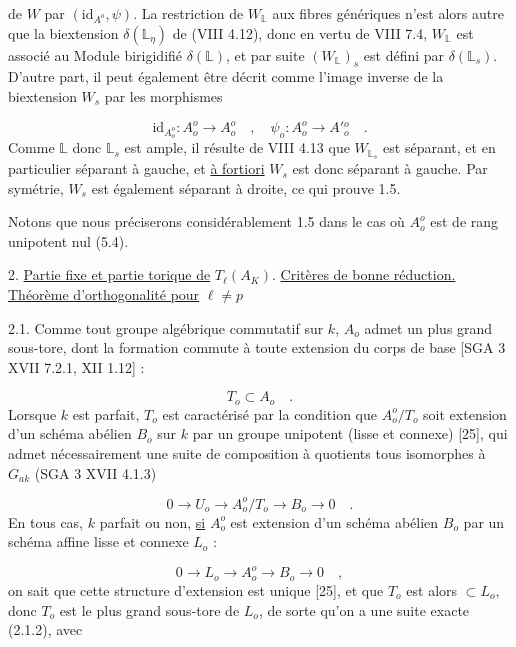 de $W$ par $(\mathrm{id}_{A^o} , \psi)$. La restriction de $W_{\mathbb{L}}$ aux fibres génériques n'est alors autre que la biextension $\delta(\mathbb{L}_\eta)$ de (VIII 4.12), donc en vertu de VIII 7.4, $W_{\mathbb{L}}$ est associé au Module birigidifié $\delta(\mathbb{L})$, et par suite $(W_{\mathbb{L}})_s$ est défini par $\delta(\mathbb{L}_s)$. D'autre part, il peut également être décrit comme l'image inverse de la biextension $W_s$ par les morphismes

\begin{equation*}
\mathrm{id}_{A^o_o} : A^o_o \longrightarrow A^o_o \quad , \quad \psi_o : A^o_o \longrightarrow A'{}^o_o \quad .
\end{equation*}
Comme $\mathbb{L}$ donc $\mathbb{L}_s$ est ample, il résulte de VIII 4.13 que $W_{\mathbb{L}_s}$ est séparant, et en particulier séparant à gauche, et \underline{à fortiori} $W_s$ est donc séparant à gauche. Par symétrie, $W_s$ est également séparant à droite, ce qui prouve 1.5.

Notons que nous préciserons considérablement 1.5 dans le cas où $A^o_o$ est de rang unipotent nul (5.4).


2. \underline{Partie fixe et partie torique de} $T_\ell(A_K)$. \underline{Critères de bonne réduction.} \underline{Théorème d'orthogonalité pour} $\ell \neq p$

2.1.  Comme tout groupe algébrique commutatif sur $k$, $A_o$ admet un plus grand sous-tore, dont la formation commute à toute extension du corps de base [SGA 3 XVII 7.2.1, XII 1.12] :

\begin{equation}\tag{2.1.1}
T_o \subset A_o \quad .
\end{equation}
Lorsque $k$ est parfait, $T_o$ est caractérisé par la condition que $A^o_o/T_o$ soit extension d'un schéma abélien $B_o$ sur $k$ par un groupe unipotent (lisse et connexe) [25], qui admet nécessairement une suite de composition à quotients tous isomorphes à $G_{ak}$ (SGA 3 XVII 4.1.3)



\begin{equation}\tag{2.1.2}
0 \longrightarrow U_o \longrightarrow A_o^o/T_o \longrightarrow B_o \longrightarrow 0 \quad .
\end{equation}
En tous cas, $k$ parfait ou non, \underline{si} $A_o^o$ est extension d'un schéma abélien $B_o$ par un schéma affine lisse et connexe $L_o$ :

\begin{equation}\tag{2.1.3}
0 \longrightarrow L_o \longrightarrow A_o^o \longrightarrow B_o \longrightarrow 0 \quad ,
\end{equation}
on sait que cette structure d'extension est unique [25], et que $T_o$ est alors $\subset L_o$, donc $T_o$ est le plus grand sous-tore de $L_o$, de sorte qu'on a une suite exacte (2.1.2), avec

